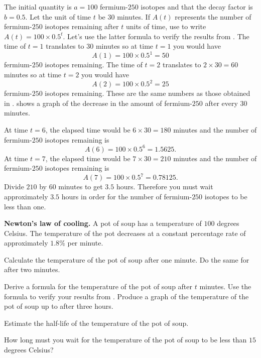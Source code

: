 \documentclass[a4paper,oneside,12pt]{article}
\begin{document}
{\begin{solution}
The initial quantity is $a = 100$ fermium-$250$ isotopes and that the
decay factor is $b = 0.5$.  Let the unit of time $t$ be $30$ minutes.
If $A(t)$ represents the number of fermium-$250$ isotopes remaining
after $t$ units of time, use  to write
$A(t) = 100 \times 0.5^t$.  Let's use the latter formula to verify the
results from .  The time of
$t = 1$ translates to $30$ minutes so at time $t = 1$ you would have
\[
A(1)
=
100 \times 0.5^1
=
50
\]
fermium-$250$ isotopes remaining.  The time of $t = 2$ translates to
$2 \times 30 = 60$ minutes so at time $t = 2$ you would have
\[
A(2)
=
100 \times 0.5^2
=
25
\]
fermium-$250$ isotopes remaining.  These are the same numbers as those
obtained in .
 shows a graph of the decrease in the
amount of fermium-$250$ after every $30$ minutes.

At time $t = 6$, the elapsed time would be $6 \times 30 = 180$ minutes
and the number of fermium-$250$ isotopes remaining is
\[
A(6)
=
100 \times 0.5^6
=
1.5625.
\]
At time $t = 7$, the elapsed time would be $7 \times 30 = 210$ minutes
and the number of fermium-$250$ isotopes remaining is
\[
A(7)
=
100 \times 0.5^7
=
0.78125.
\]
Divide $210$ by $60$ minutes to get $3.5$ hours.  Therefore you must
wait approximately $3.5$ hours in order for the number of
fermium-$250$ isotopes to be less than one.
\end{solution}
}{}

\begin{exercise}
\textbf{Newton's law of cooling.}
A pot of soup has a temperature of $100$ degrees Celsius.  The
temperature of the pot decreases at a constant percentage rate of
approximately $1.8\%$ per minute.
\begin{packedenum}
\item\label{subex:soup_temperature_1minute_2minutes}
  Calculate the temperature of the pot of soup after one minute.  Do
  the same for after two minutes.

\item\label{subex:soup_temperature_formula_graph}
  Derive a formula for the temperature of the pot of soup after $t$
  minutes.  Use the formula to verify your results
  from .  Produce a
  graph of the temperature of the pot of soup up to after three
  hours.

\item\label{subex:soup_temperature_half_life}
  Estimate the half-life of the temperature of the pot of soup.

\item\label{subex:soup_temperature_15_degrees}
  How long must you wait for the temperature of the pot of soup to be
  less than $15$ degrees Celsius?
\end{packedenum}
\end{exercise}
\end{document}
